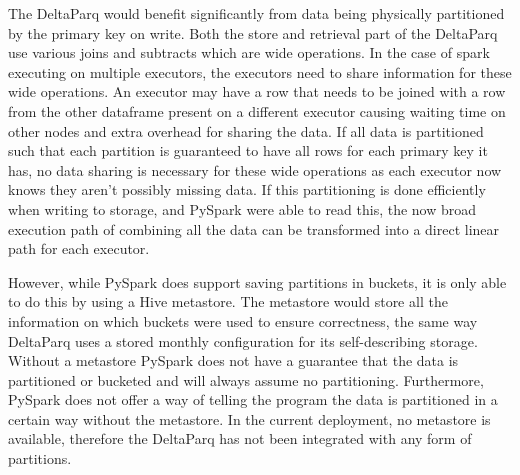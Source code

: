 The DeltaParq would benefit significantly from data being physically partitioned by the primary key on write. Both the store 
and retrieval part of the DeltaParq use various joins and subtracts which are wide operations. In the case of spark executing 
on multiple executors, the executors need to share information for these wide operations. An executor may have a row that needs to be joined with a row 
from the other dataframe present on a different executor causing waiting time on other nodes and extra overhead for sharing the data. 
If all data is partitioned such that each partition is guaranteed to have all rows for each primary key it has, no data sharing is 
necessary for these wide operations as each executor now knows they aren't possibly missing data. If this partitioning is done efficiently
when writing to storage, and PySpark were able to read this, the now broad execution path of combining all the data can be transformed into a direct linear 
path for each executor.

However, while PySpark does support saving partitions in buckets, it is only able to do this by using a Hive metastore. The 
metastore would store all the information on which buckets were used to ensure correctness, the same way DeltaParq uses a stored 
monthly configuration for its self-describing storage. Without a metastore PySpark does not have a guarantee that the data is 
partitioned or bucketed and will always assume no partitioning. Furthermore, PySpark does not offer a way of telling the program 
the data is partitioned in a certain way without the metastore. In the current deployment, no metastore is available, therefore 
the DeltaParq has not been integrated with any form of partitions.




    
